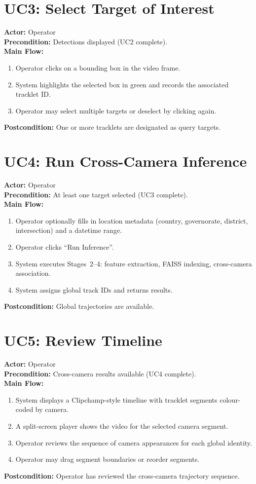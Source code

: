 \section*{UC3: Select Target of Interest}
\textbf{Actor:} Operator \\
\textbf{Precondition:} Detections displayed (UC2 complete). \\
\textbf{Main Flow:}
\begin{enumerate}
    \item Operator clicks on a bounding box in the video frame.
    \item System highlights the selected box in green and records the associated tracklet ID.
    \item Operator may select multiple targets or deselect by clicking again.
\end{enumerate}
\textbf{Postcondition:} One or more tracklets are designated as query targets.

\section*{UC4: Run Cross-Camera Inference}
\textbf{Actor:} Operator \\
\textbf{Precondition:} At least one target selected (UC3 complete). \\
\textbf{Main Flow:}
\begin{enumerate}
    \item Operator optionally fills in location metadata (country, governorate, district, intersection) and a datetime range.
    \item Operator clicks ``Run Inference''.
    \item System executes Stages~2--4: feature extraction, FAISS indexing, cross-camera association.
    \item System assigns global track IDs and returns results.
\end{enumerate}
\textbf{Postcondition:} Global trajectories are available.

\section*{UC5: Review Timeline}
\textbf{Actor:} Operator \\
\textbf{Precondition:} Cross-camera results available (UC4 complete). \\
\textbf{Main Flow:}
\begin{enumerate}
    \item System displays a Clipchamp-style timeline with tracklet segments colour-coded by camera.
    \item A split-screen player shows the video for the selected camera segment.
    \item Operator reviews the sequence of camera appearances for each global identity.
    \item Operator may drag segment boundaries or reorder segments.
\end{enumerate}
\textbf{Postcondition:} Operator has reviewed the cross-camera trajectory sequence.

